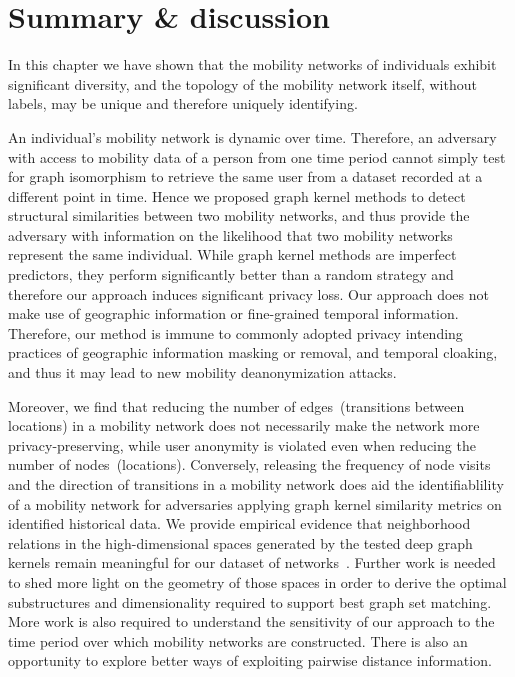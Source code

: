 \section{Summary \& discussion} %

In this chapter we have shown that the mobility networks of individuals exhibit significant diversity, and the topology of the mobility network itself, without labels, may be unique and therefore uniquely identifying.

An individual's mobility network is dynamic over time.
Therefore, an adversary with access to mobility data of a person from one time period cannot simply test for graph isomorphism to retrieve the same user from a dataset recorded at a different point in time.
Hence we proposed graph kernel methods to detect structural similarities between two mobility networks, and thus provide the adversary with information on the likelihood that two mobility networks represent the same individual.
While graph kernel methods are imperfect predictors, they perform significantly better than a random strategy and therefore our approach induces significant privacy loss.
Our approach does not make use of geographic information or fine-grained temporal information. Therefore, our method is immune to commonly adopted privacy intending practices of geographic information masking or removal, and temporal cloaking, and thus it may lead to new mobility deanonymization attacks.

Moreover, we find that reducing the number of edges~(transitions between locations) in a mobility network does not necessarily make the network more privacy-preserving, while user anonymity is violated even when reducing the number of nodes~(locations).
Conversely, releasing the frequency of node visits and the direction of transitions in a mobility network does aid the identifiablility of a mobility network for adversaries applying graph kernel similarity metrics on identified historical data.
We provide empirical evidence that neighborhood relations in the high-dimensional spaces generated by the tested deep graph kernels remain meaningful for our dataset of networks~\citep{Beyer}.
Further work is needed to shed more light on the geometry of those spaces in order to derive the optimal substructures and dimensionality required to support best graph set matching.
More work is also required to understand the sensitivity of our approach to the time period over which mobility networks are constructed.
There is also an opportunity to explore better ways of exploiting pairwise distance information.

